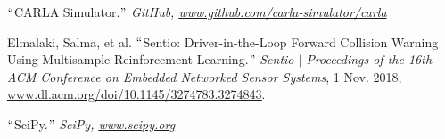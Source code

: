 \documentclass[12pt]{article}
\renewcommand{\_}{\kern-1.5pt\textunderscore\kern-1.5pt}
\begin{document}
$``$CARLA Simulator.$"$  \textit{GitHub, \href{http://www.github.com/carla-simulator/carla}{}\textcolor[HTML]{1155CC}{\ul{www.github.com/carla-simulator/carla}}}\par

Elmalaki, Salma, et al. $``$Sentio: Driver-in-the-Loop Forward Collision Warning Using Multisample Reinforcement Learning.$"$  \textit{Sentio $ \vert $  Proceedings of the 16th ACM Conference on Embedded Networked Sensor Systems}, 1 Nov. 2018, \href{http://www.dl.acm.org/doi/10.1145/3274783.3274843}{\textcolor[HTML]{1155CC}{\ul{www.dl.acm.org/doi/10.1145/3274783.3274843}}}.\par

$``$SciPy.$"$  \textit{SciPy, \href{http://www.scipy.org}{}\textcolor[HTML]{1155CC}{\ul{www.scipy.org}}}\par


\vspace{\baselineskip}

\vspace{\baselineskip}

\vspace{\baselineskip}

\vspace{\baselineskip}

\vspace{\baselineskip}

\vspace{\baselineskip}

\vspace{\baselineskip}

\vspace{\baselineskip}

\vspace{\baselineskip}

\vspace{\baselineskip}

\vspace{\baselineskip}

\vspace{\baselineskip}

\vspace{\baselineskip}

\vspace{\baselineskip}

\printbibliography
\end{document}
